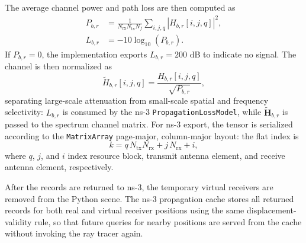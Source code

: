 The average channel power and path loss are then computed as
\begin{align}
    P_{b,r} & =
    \frac{1}{N_{\mathrm{rx}}N_{\mathrm{tx}}N_f}
    \sum_{i,j,q}\left|H_{b,r}[i,j,q]\right|^2, \\
    L_{b,r} & =-10\log_{10}(P_{b,r}).
\end{align}
If $P_{b,r}=0$, the implementation exports $L_{b,r}=200$ dB to indicate no signal.
The channel is then normalized as
\begin{equation}
    \widetilde{H}_{b,r}[i,j,q]
    =
    \frac{H_{b,r}[i,j,q]}{\sqrt{P_{b,r}}},
\end{equation}
separating large-scale attenuation from small-scale spatial and frequency
selectivity: $L_{b,r}$ is consumed by the ns-3 \texttt{PropagationLossModel},
while $\widetilde{\mathbf{H}}_{b,r}$ is passed to the spectrum channel matrix.
For ns-3 export, the tensor is serialized according to the \texttt{MatrixArray}
page-major, column-major layout: the flat index is
\begin{equation}
    k = q\,N_{\mathrm{tx}}N_{\mathrm{rx}}
    + j\,N_{\mathrm{rx}}
    + i,
\end{equation}
where $q$, $j$, and $i$ index resource block, transmit antenna element, and
receive antenna element, respectively.

After the records are returned to ns-3, the temporary virtual receivers are
removed from the Python scene.
The ns-3 propagation cache stores all returned records for both real and
virtual receiver positions using the same displacement-validity rule, so that
future queries for nearby positions are served from the cache without invoking
the ray tracer again.
